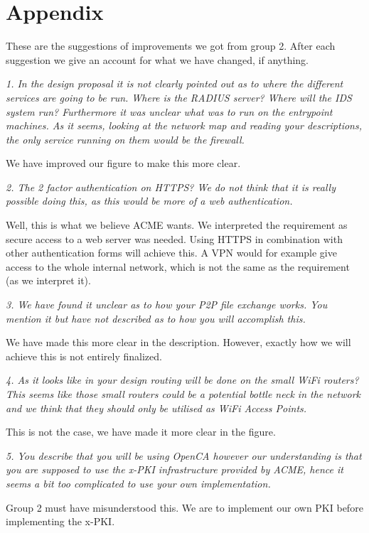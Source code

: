 \section*{Appendix}

These are the suggestions of improvements we got from group 2. After each suggestion we give an account for what we have changed, if anything.

\textit{1. In the design proposal it is not clearly pointed out as to where the different services are going to be run. Where is the RADIUS server? Where will the IDS system run? Furthermore it was unclear what was to run on the entrypoint machines. As it seems, looking at the network map and reading your descriptions, the only service running on them would be the firewall.}

We have improved our figure to make this more clear.

\textit{2. The 2 factor authentication on HTTPS? We do not think that it is really possible doing this, as this would be more of a web authentication.}

Well, this is what we believe ACME wants. We interpreted the requirement as secure access to a web server was needed. Using HTTPS in combination with other authentication forms will achieve this. A VPN would for example give access to the whole internal network, which is not the same as the requirement (as we interpret it).

\textit{3. We have found it unclear as to how your P2P file exchange works. You mention it but have not described as to how you will accomplish this.}

We have made this more clear in the description. However, exactly how we will achieve this is not entirely finalized.

\textit{4. As it looks like in your design routing will be done on the small WiFi routers? This seems like those small routers could be a potential bottle neck in the network and we think that they should only be utilised as WiFi Access Points.}

This is not the case, we have made it more clear in the figure.

\textit{5. You describe that you will be using OpenCA however our understanding is that you are supposed to use the x-PKI infrastructure provided by ACME, hence it seems a bit too complicated to use your own implementation.}

Group 2 must have misunderstood this. We are to implement our own PKI before implementing the x-PKI.


